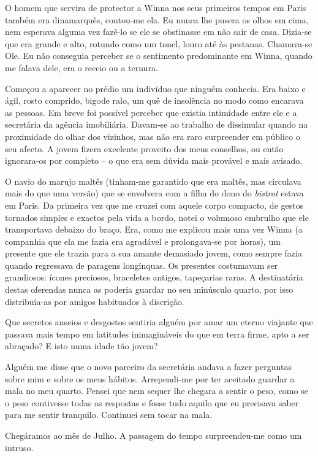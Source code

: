 O homem que servira de protector a Winna nos seus primeiros tempos em
Paris também era dinamarquês, contou-me ela. Eu nunca lhe pusera os olhos em cima, nem esperava alguma vez
fazê-lo se ele se obstinasse em não sair de casa. Dizia-se que era
grande e alto, rotundo como um tonel, louro até às pestanas. Chamava-se
Ole. Eu não conseguia perceber se o sentimento predominante em Winna,
quando me falava dele, era o receio ou a ternura.

Começou a aparecer no prédio um indivíduo que ninguém conhecia. Era
baixo e ágil, rosto comprido, bigode ralo, um quê de insolência no modo
como encarava as pessoas. Em breve foi possível perceber que existia
intimidade entre ele e
a secretária da agência imobiliária. Davam-se ao trabalho de dissimular
quando na proximidade do olhar dos vizinhos, mas não era raro
surpreender em público o seu afecto. A jovem fizera excelente proveito
dos meus conselhos, ou então ignorara-os por completo -- o que era sem
dúvida mais provável e mais avisado.

O navio do marujo maltês (tinham-me garantido que era maltês, mas
circulava mais do que uma versão) que se envolvera com a filha do dono
do \emph{bistrot }estava em Paris. Da primeira vez que me cruzei com
aquele corpo compacto, de gestos tornados simples e exactos pela vida
a bordo, notei o volumoso embrulho que ele transportava debaixo do
braço. Era, como me explicou mais uma vez Winna (a companhia que ela me
fazia era agradável e prolongava-se por horas), um presente que ele
trazia para a sua amante demasiado jovem, como sempre fazia quando
regressava de paragens longínquas. Os presentes costumavam ser
grandiosos: ícones preciosos, braceletes antigos, tapeçarias raras. A
destinatária destas oferendas nunca as poderia guardar no seu minúsculo
quarto, por isso distribuía-as por amigos habituados à discrição.

Que secretos anseios e desgostos sentiria alguém por amar um eterno
viajante que passava mais tempo em latitudes inimagináveis do que em
terra firme, apto a ser abraçado? E isto numa idade tão jovem?

Alguém me disse que o novo parceiro da secretária andava a fazer
perguntas sobre mim e sobre os meus hábitos. Arrependi-me por ter
aceitado guardar a mala no meu quarto. Pensei que nem sequer lhe chegara
a sentir o peso, como se o peso contivesse todas as respostas e fosse
tudo aquilo que eu precisava saber para me sentir tranquilo. Continuei
sem tocar na mala.

Chegáramos ao mês de Julho. A passagem do tempo surpreendeu-me como um
intruso.

